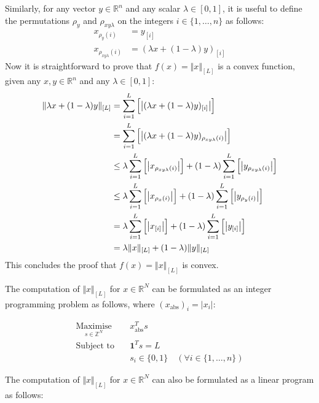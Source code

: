 Similarly, for any vector $y\in\mathbb{R}^n$ and any scalar $\lambda\in[0, 1]$, it is useful to define the permutations $\rho_y$ and $\rho_{xy\lambda}$ on the integers $i\in\{1,\hdots,n\}$ as follows:
\begin{align*}
    x_{\rho_y(i)} &= y_{[i]} \\
    x_{\rho_{xy\lambda}(i)} &= (\lambda x + (1 - \lambda)y)_{[i]}
\end{align*}
Now it is straightforward to prove that $f(x) = \Vert x \Vert_{[L]}$ is a convex function, given any $x, y\in\mathbb{R}^n$ and any $\lambda\in[0, 1]$:
\begin{align*}
    \Vert \lambda x + (1 - \lambda)y \Vert_{[L]} &= \sum_{i=1}^L{\Bigl[ \left\vert (\lambda x + (1 - \lambda)y)_{[i]} \right\vert \Bigr]} \\
    &= \sum_{i=1}^L{\Bigl[ \left\vert (\lambda x + (1 - \lambda)y)_{\rho_{xy\lambda}(i)} \right\vert \Bigr]} \\
    &\le \lambda\sum_{i=1}^L{\Bigl[ \left\vert x_{\rho_{xy\lambda}(i)} \right\vert \Bigr]} + (1 - \lambda)\sum_{i=1}^L{\Bigl[ \left\vert y_{\rho_{xy\lambda}(i)} \right\vert \Bigr]} \\
    &\le \lambda\sum_{i=1}^L{\Bigl[ \left\vert x_{\rho_x(i)} \right\vert \Bigr]} + (1 - \lambda)\sum_{i=1}^L{\Bigl[ \left\vert y_{\rho_y(i)} \right\vert \Bigr]} \\
    &= \lambda\sum_{i=1}^L{\Bigl[ \left\vert x_{[i]} \right\vert \Bigr]} + (1 - \lambda)\sum_{i=1}^L{\Bigl[ \left\vert y_{[i]} \right\vert \Bigr]} \\
    &= \lambda\Vert x \Vert_{[L]} + (1 - \lambda)\Vert y \Vert_{[L]}
\end{align*}
This concludes the proof that $f(x) = \Vert x \Vert_{[L]}$ is convex.

The computation of $\Vert x \Vert_{[L]}$ for $x\in\mathbb{R}^N$ can be formulated as an integer programming problem as follows, where $(x_\text{abs})_i = \vert x_i \vert$:

\begin{align*}
    \underset{s\in\mathbb{Z}^N}{\text{Maximise}} \quad & x_\text{abs}^T s \\
    \text{Subject to} \quad & \mathbf{1}^Ts = L \\
    & s_i\in\{0, 1\} \quad (\forall i\in\{1, \hdots, n\})
\end{align*}

The computation of $\Vert x \Vert_{[L]}$ for $x\in\mathbb{R}^N$ can also be formulated as a linear program as follows:


